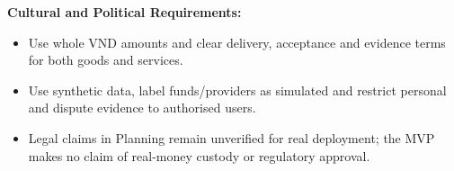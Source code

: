 \medskip\noindent\textbf{Cultural and Political Requirements:}
\begin{itemize}
\item Use whole VND amounts and clear delivery, acceptance and evidence terms for both goods and services.
\item Use synthetic data, label funds/providers as simulated and restrict personal and dispute evidence to authorised users.
\item Legal claims in Planning remain unverified for real deployment; the MVP makes no claim of real-money custody or regulatory approval.
\end{itemize}
